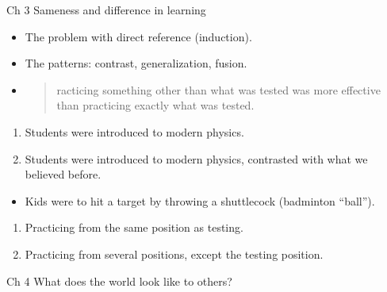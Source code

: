\begin{frame}
  \begin{block}{Ch 3 Sameness and difference in learning}
    \begin{itemize}
      \item The problem with direct reference (induction).
      \item The patterns: contrast, generalization, fusion.
      \item \blockcquote[p.~71]{NecessaryConditionsOfLearning}{%
          racticing something other than what was tested was more 
          effective than practicing exactly what was tested.%
        }
    \end{itemize}
  \end{block}
\end{frame}

\begin{frame}
  \begin{example}[Physics]
    \begin{enumerate}
      \item Students were introduced to modern physics.
      \item Students were introduced to modern physics, contrasted with what we 
        believed before.
    \end{enumerate}
  \end{example}
\end{frame}

\begin{frame}
  \begin{example}
    \begin{itemize}
      \item Kids were to hit a target by throwing a shuttlecock (badminton 
        \enquote{ball}).
    \end{itemize}
    \begin{enumerate}
      \item Practicing from the same position as testing.
      \item Practicing from several positions, except the testing position.
    \end{enumerate}
  \end{example}
\end{frame}

\begin{frame}
  \begin{block}{Ch 4 What does the world look like to others?}
  \end{block}
\end{frame}

